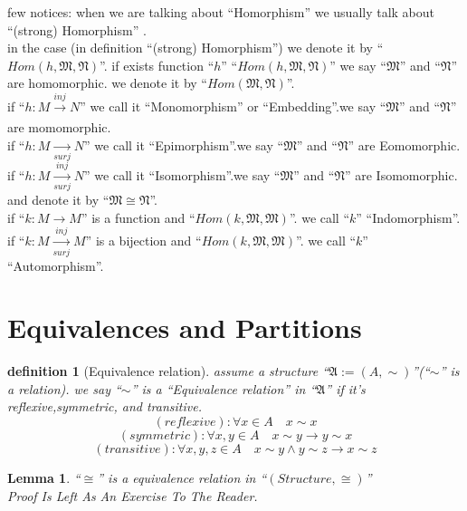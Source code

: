 \documentclass[10pt,a4paper]{book}
\newtheorem{definition}{definition}[section]
\newtheorem{lemma}{Lemma}[section]
\begin{document}
few notices: when we are talking about ``Homorphism'' we usually talk about
``(strong) Homorphism'' .\\ in the case (in definition ``(strong) Homorphism'')
we denote it by ``$Hom(h,\mathfrak{M} , \mathfrak{N} )$''. if exists function
``$h$'' ``$Hom(h,\mathfrak{M} , \mathfrak{N} )$'' we say ``$\mathfrak{M}$'' and
``$\mathfrak{N}$'' are homomorphic. we denote it by ``$Hom(\mathfrak{M} ,
    \mathfrak{N} )$''.\\ if ``$h : M \xrightarrow[]{inj} N$'' we call it
``Monomorphism'' or ``Embedding''.we say ``$\mathfrak{M}$'' and
``$\mathfrak{N}$'' are momomorphic.\\ if ``$h : M \xrightarrow[surj]{} N$'' we
call it ``Epimorphism''.we say ``$\mathfrak{M}$'' and ``$\mathfrak{N}$'' are
Eomomorphic.\\ if ``$h : M \xrightarrow[surj]{inj} N$'' we call it
``Isomorphism''.we say ``$\mathfrak{M}$'' and ``$\mathfrak{N}$'' are
Isomomorphic. and denote it by ``$ \mathfrak{M} \cong \mathfrak{N}$''.\\ if
``$k : M \to M$'' is a function and ``$Hom(k,\mathfrak{M},\mathfrak{M})$''. we
call ``$k$'' ``Indomorphism''.\\ if ``$k : M \xrightarrow[surj]{inj} M$'' is a
bijection and ``$Hom(k,\mathfrak{M},\mathfrak{M})$''. we call ``$k$''
``Automorphism''.\\

\section{Equivalences and Partitions}

\begin{definition} [Equivalence relation]
     assume  a structure ``$\mathfrak{A} := (A , \sim ) $''(``$\sim $'' is a relation).
    we say ``$\sim $''
    is a ``Equivalence relation'' in  ``$\mathfrak{A}$'' if it's  reflexive,symmetric, and transitive.
    \[ (reflexive) :  \forall x \in A \quad x \sim x \]
    \[ (symmetric) :   \forall x,y \in A \quad x \sim y \to y \sim x \]
    \[ (transitive) :  \forall x,y,z \in A \quad x \sim y \land y \sim z \to x \sim z  \]
\end{definition}

\begin{lemma} ``$\cong$'' is a equivalence relation in ``$(Structure , \cong)$''\\
    Proof Is Left As An Exercise To The Reader.
\end{lemma}
\end{document}
